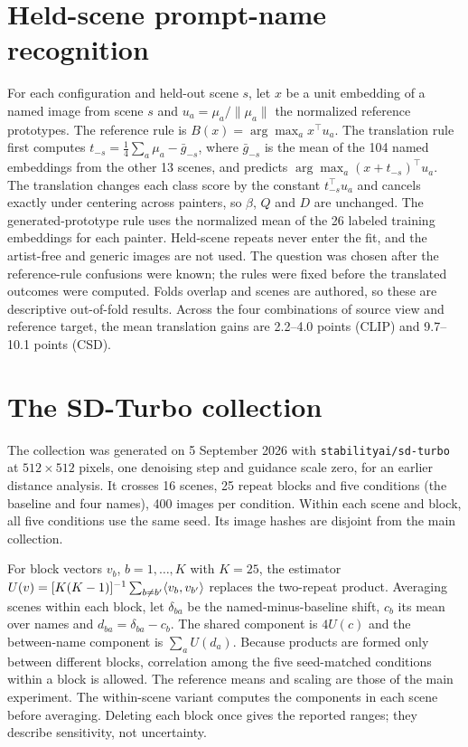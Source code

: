 \FloatBarrier
\section{Held-scene prompt-name recognition}\label{app:transfer}



For each configuration and held-out scene $s$, let $x$ be a unit embedding of a
named image from scene $s$ and $u_a=\mu_a/\|\mu_a\|$ the normalized reference
prototypes. The reference rule is $B(x)=\arg\max_a x^\top u_a$. The translation rule
first computes $t_{-s}=\frac14\sum_a\mu_a-\bar g_{-s}$, where $\bar g_{-s}$ is the
mean of the 104 named embeddings from the other 13 scenes, and predicts
$\arg\max_a(x+t_{-s})^\top u_a$. The translation changes each class score by the
constant $t_{-s}^\top u_a$ and cancels exactly under centering across painters, so
$\beta$, $Q$ and $D$ are unchanged. The generated-prototype rule uses the normalized
mean of the 26 labeled training embeddings for each painter. Held-scene repeats never
enter the fit, and the artist-free and generic images are not used. The question was
chosen after the reference-rule confusions were known; the rules were fixed before
the translated outcomes were computed. Folds overlap and scenes are authored, so these
are descriptive out-of-fold results. Across the four combinations of source view
and reference target, the mean translation gains are 2.2--4.0 points (CLIP) and
9.7--10.1 points (CSD).

\FloatBarrier
\section{The SD-Turbo collection}\label{app:sdturbo}

The collection was generated on 5 September 2026 with \texttt{stabilityai/sd-turbo}
at $512\times512$ pixels, one denoising step and guidance scale zero, for an earlier
distance analysis. It crosses 16 scenes, 25 repeat blocks and five conditions (the
baseline and four names), 400 images per condition. Within each scene and block, all
five conditions use the same seed. Its image hashes are disjoint from the main
collection.

For block vectors $v_b$, $b=1,\dots,K$ with $K=25$, the estimator
$U(v)=[K(K-1)]^{-1}\sum_{b\ne b'}\langle v_b,v_{b'}\rangle$ replaces the two-repeat product.
Averaging scenes within each block, let $\delta_{ba}$ be the named-minus-baseline
shift, $c_b$ its mean over names and $d_{ba}=\delta_{ba}-c_b$. The shared component is
$4U(c)$ and the between-name component is $\sum_aU(d_a)$. Because products are formed
only between different blocks, correlation among the five seed-matched conditions
within a block is allowed. The reference means and scaling are those of the main
experiment. The within-scene variant computes the components in each scene before
averaging. Deleting each block once gives the reported ranges; they describe
sensitivity, not uncertainty.

